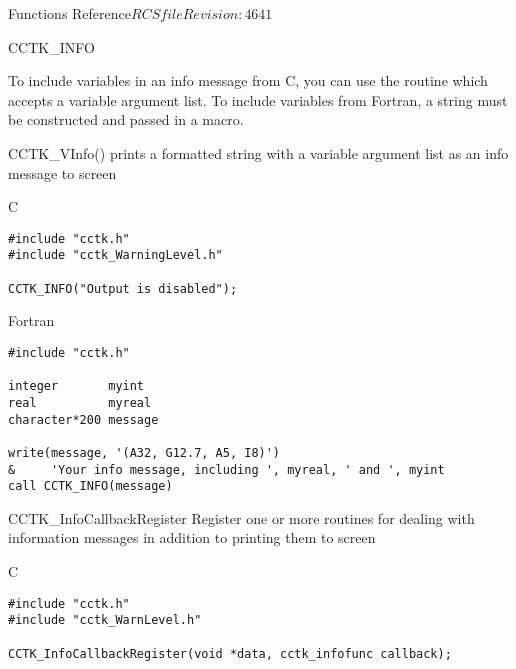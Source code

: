 \begin{cactuspart}{ Functions Reference}{$RCSfile$}{$Revision: 4641 $}
\begin{FunctionDescription}{CCTK\_INFO}
\begin{Discussion}
To include variables in an info message from C, you can use the routine
 which accepts a variable argument list.
To include variables from Fortran, a string must be constructed and passed
in a  macro.
\end{Discussion}

\begin{SeeAlsoSection}
\begin{SeeAlso}{CCTK\_VInfo()}
prints a formatted string with a variable argument list as an info message to
screen
\end{SeeAlso}
\end{SeeAlsoSection}

\begin{ExampleSection}
\begin{Example}{C}
\begin{verbatim}
#include "cctk.h"
#include "cctk_WarningLevel.h"

CCTK_INFO("Output is disabled");
\end{verbatim}
\end{Example}
\begin{Example}{Fortran}
\begin{verbatim}
#include "cctk.h"

integer       myint
real          myreal
character*200 message

write(message, '(A32, G12.7, A5, I8)')
&     'Your info message, including ', myreal, ' and ', myint
call CCTK_INFO(message)
\end{verbatim}
\end{Example}
\end{ExampleSection}
\end{FunctionDescription}

\begin{FunctionDescription}{CCTK\_InfoCallbackRegister}
\label{CCTK-INFOCallbackRegister}
Register one or more routines for dealing with information messages in
addition to printing them to screen
\begin{SynopsisSection}
\begin{Synopsis}{C}
\begin{verbatim}
#include "cctk.h"
#include "cctk_WarnLevel.h"

CCTK_InfoCallbackRegister(void *data, cctk_infofunc callback);

\end{verbatim}
\end{Synopsis}
\end{SynopsisSection}


\end{FunctionDescription}
\end{cactuspart}
